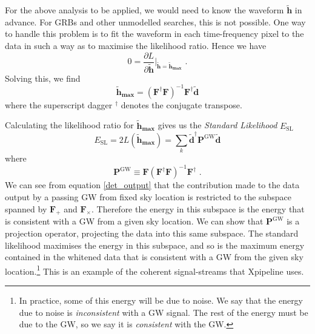 \documentclass[11pt]{cuthesis}
\newcommand{\fs}{\text{ .}}
\newcommand{\tbd}{\tilde{\textbf{d}}}
\newcommand{\tbh}{\tilde{\textbf{h}}}
\begin{document}
For the above analysis to be applied, we would need to know the waveform $\tbh$ in advance. For GRBs and other unmodelled searches, this is not possible. One way to handle this problem is to fit the waveform in each time-frequency pixel to the data in such a way as to maximise the likelihood ratio. Hence we have
\begin{equation}
0=\frac{\partial L}{\partial \tbh} \bigg|_{\tbh=\tbh_{\textbf{max}}} \fs
\end{equation} 
Solving this, we find
\begin{equation} 
\tbh_\textbf{max}=(\textbf{F}^\dagger \textbf{F} )^{-1} \textbf{F}^\dagger \tbd
\end{equation}
where the superscript dagger $^\dagger$ denotes the conjugate transpose. 

Calculating the likelihood ratio for $\tbh_\textbf{max}$ gives us the \emph{Standard Likelihood} $E_\text{SL}$
\begin{equation} \label{Esl}
E_\text{SL}=2L(\tbh_\textbf{max} )=\sum_k \tbd^\dagger \textbf{P}^\text{GW} \tbd
\end{equation}
where 
\begin{equation} \label{projOp1}
\textbf{P}^\text{GW} \equiv \textbf{F} (\textbf{F}^\dagger \textbf{F})^{-1} \textbf{F}^\dagger \fs
\end{equation}
We can see from equation \ref{det_output} that the contribution made to the data output by a passing GW from fixed sky location is restricted to the subspace spanned by $\textbf{F}_+$ and $\textbf{F}_\times$. Therefore the energy in this subspace is the energy that is consistent with a GW from a given sky location. We can show that $\textbf{P}^\text{GW} $ is a projection operator, projecting the data into this same subspace. The standard likelihood maximises the energy in this subspace, and so is the maximum energy contained in the whitened data that is consistent with a GW from the given sky location.\footnote{In practice, some of this energy will be due to noise. We say that the energy due to noise is \emph{inconsistent} with a GW signal. The rest of the energy must be due to the GW, so we say it is \emph{consistent} with the GW.} This is an example of the coherent signal-streams that Xpipeline uses.
\end{document}
